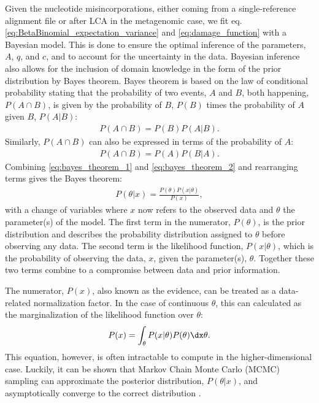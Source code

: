 Given the nucleotide misincorporations, either coming from a single-reference alignment file or after LCA in the metagenomic case, we fit eq. \eqref{eq:BetaBinomial_expectation_variance} and \eqref{eq:damage_function} with a Bayesian model. This is done to ensure the optimal inference of the parameters, $A$, $q$, and $c$, and to account for the uncertainty in the data. Bayesian inference also allows for the inclusion of domain knowledge in the form of the prior distribution by Bayes theorem. Bayes theorem is based on the law of conditional probability \autocite{barlowStatisticsGuideUse1993} stating that the probability of two events, $A$ and $B$, both happening, $P(A \cap B)$, is given by the probability of $B$, $P(B)$ times the probability of $A$ given $B$, $P(A|B)$:
\begin{align}
    P(A \cap B) = P(B)P(A|B).
    \label{eq:bayes_theorem_1}
\end{align}
Similarly, $P(A \cap B)$ can also be expressed in terms of the probability of $A$:
\begin{align}
    P(A \cap B) = P(A)P(B|A).
    \label{eq:bayes_theorem_2}
\end{align}
Combining \autoref{eq:bayes_theorem_1} and \autoref{eq:bayes_theorem_2} and rearranging terms gives the Bayes theorem:
\begin{align}
    P(\theta|x) = \frac{P(\theta)P(x|\theta)}{P(x)},
    \label{eq:bayes_theorem}
\end{align}
with a change of variables where $x$ now refers to the observed data and $\theta$ the parameter(s) of the model. The first term in the numerator, $P(\theta)$, is the prior distribution and describes the probability distribution assigned to $\theta$ before observing any data. The second term is the likelihood function, $P(x|\theta)$, which is the probability of observing the data, $x$, given the parameter(s), $\theta$. Together these two terms combine to a compromise between data and prior information.

The numerator, $P(x)$, also known as the evidence, can be treated as a data-related normalization factor. In the case of continuous $\theta$, this can calculated as the marginalization of the likelihood function over $\theta$:
\begin{align}
    P(x) = \int_\theta P(x|\theta)P(\theta) \dx \theta.
    \label{eq:evidence}
\end{align}
This equation, however, is often intractable to compute in the higher-dimensional case. Luckily, it can be shown that Markov Chain Monte Carlo (MCMC) sampling can approximate the posterior distribution, $P(\theta|x)$, and asymptotically converge to the correct distribution \autocite{gelmanBayesianDataAnalysis2015a}.

